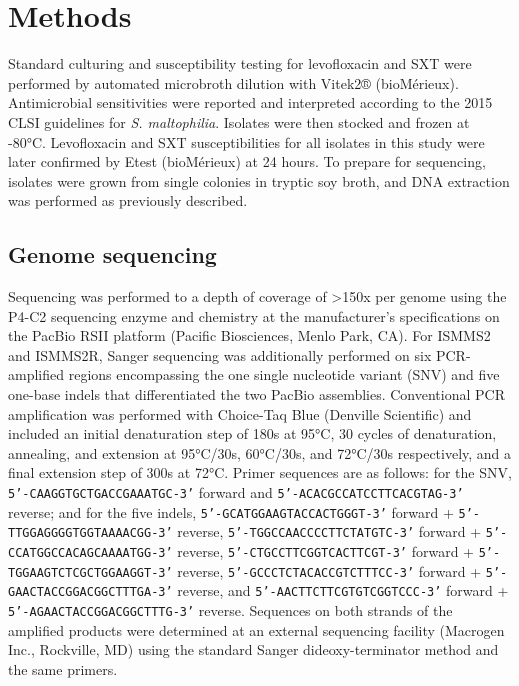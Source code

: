 \section{Methods}

Standard culturing and susceptibility testing for levofloxacin and SXT were performed by automated microbroth dilution with Vitek2® (bioMérieux). Antimicrobial sensitivities were reported and interpreted according to the 2015 CLSI guidelines for \emph{S. maltophilia}.\autocite{ClinicalandLaboratoryStandardsInstitute2015} Isolates were then stocked and frozen at -80°C. Levofloxacin and SXT susceptibilities for all isolates in this study were later confirmed by Etest (bioMérieux) at 24 hours. To prepare for sequencing, isolates were grown from single colonies in tryptic soy broth, and DNA extraction was performed as previously described.\autocite{Altman2014}

\subsection{Genome sequencing}

Sequencing was performed to a depth of coverage of >150x per genome using the P4-C2 sequencing enzyme and chemistry at the manufacturer’s specifications on the PacBio RSII platform (Pacific Biosciences, Menlo Park, CA). For ISMMS2 and ISMMS2R, Sanger sequencing was additionally performed on six PCR-amplified regions encompassing the one single nucleotide variant (SNV) and five one-base indels that differentiated the two PacBio assemblies. Conventional PCR amplification was performed with Choice-Taq Blue (Denville Scientific) and included an initial denaturation step of 180s at 95°C, 30 cycles of denaturation, annealing, and extension at 95°C/30s, 60°C/30s, and 72°C/30s respectively, and a final extension step of 300s at 72°C. Primer sequences are as follows: for the SNV, \texttt{5’-CAAGGTGCTGACCGAAATGC-3’} forward and \texttt{5’-ACACGCCATCCTTCACGTAG-3’} reverse; and for the five indels, \texttt{5’-GCATGGAAGTACCACTGGGT-3’} forward + \texttt{5’-TTGGAGGGGTGGTAAAACGG-3’} reverse, \texttt{5’-TGGCCAACCCCTTCTATGTC-3’} forward + \texttt{5’-CCATGGCCACAGCAAAATGG-3’} reverse, \texttt{5’-CTGCCTTCGGTCACTTCGT-3’} forward + \texttt{5’-TGGAAGTCTCGCTGGAAGGT-3’} reverse, \texttt{5’-GCCCTCTACACCGTCTTTCC-3’} forward + \texttt{5’-GAACTACCGGACGGCTTTGA-3’} reverse, and \texttt{5’-AACTTCTTCGTGTCGGTCCC-3’} forward + \texttt{5’-AGAACTACCGGACGGCTTTG-3’} reverse. Sequences on both strands of the amplified products were determined at an external sequencing facility (Macrogen Inc., Rockville, MD) using the standard Sanger dideoxy-terminator method and the same primers.

